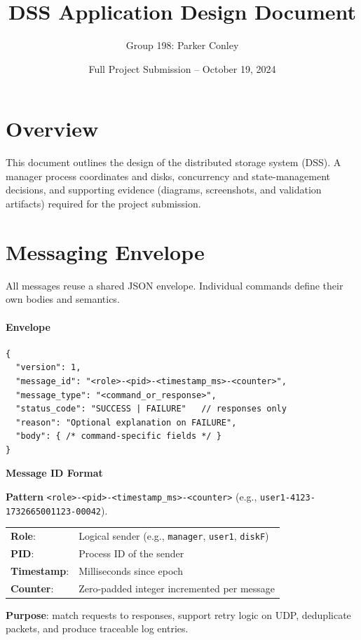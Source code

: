 \documentclass[11pt]{article}
\title{DSS Application Design Document}
\author{Group 198: Parker Conley}
\date{Full Project Submission -- October 19, 2024}
\begin{document}
\maketitle
\tableofcontents
\newpage

\section{Overview}

This document outlines the design of the distributed storage system (DSS). A manager process coordinates and disks, concurrency and state-management decisions, and supporting evidence (diagrams, screenshots, and validation artifacts) required for the project submission.

\section{Messaging Envelope}
All messages reuse a shared JSON envelope. Individual commands define their own bodies and semantics.

\paragraph{Envelope}
\begin{verbatim}
{
  "version": 1,
  "message_id": "<role>-<pid>-<timestamp_ms>-<counter>",
  "message_type": "<command_or_response>",
  "status_code": "SUCCESS | FAILURE"   // responses only
  "reason": "Optional explanation on FAILURE",
  "body": { /* command-specific fields */ }
}
\end{verbatim}

\noindent\textbf{Message ID Format}\par
\noindent\textbf{Pattern} \texttt{<role>-<pid>-<timestamp\_ms>-<counter>} (e.g., \texttt{user1-4123-1732665001123-00042}).\par
\begin{tabular}{@{}ll@{}}
\textbf{Role}: & Logical sender (e.g., \texttt{manager}, \texttt{user1}, \texttt{diskF}) \\
\textbf{PID}: & Process ID of the sender \\
\textbf{Timestamp}: & Milliseconds since epoch \\
\textbf{Counter}: & Zero-padded integer incremented per message \\
\end{tabular}

\noindent\textbf{Purpose}: match requests to responses, support retry logic on UDP, deduplicate packets, and produce traceable log entries.
\end{document}
